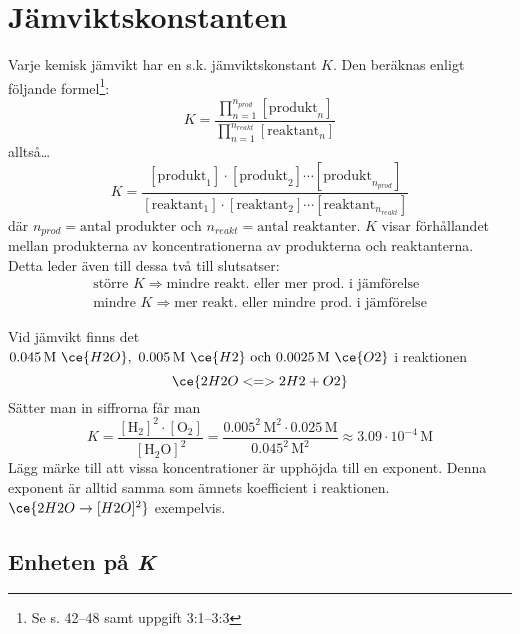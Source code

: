 \section{Jämviktskonstanten}

Varje kemisk jämvikt har en s.k. jämviktskonstant $K$. Den beräknas enligt följande formel\footnote{Se s. 42--48 samt uppgift 3:1--3:3}:
\begin{equation*}
    \label{eq:jmvkonstant}
    K = \frac{\prod_{n=1}^{n_{prod}}[\mathrm{produkt}_n]}{\prod_{n=1}^{n_{reakt}}[\mathrm{reaktant}_n]}
\end{equation*}
alltså\ldots
\begin{equation*}
    K = \frac{[\mathrm{produkt}_1] \cdot [\mathrm{produkt}_2] \dotsm [\mathrm{produkt}_{n_{prod}}]}{[\mathrm{reaktant}_1] \cdot [\mathrm{reaktant}_2] \dotsm [\mathrm{reaktant}_{n_{reakt}}]}
\end{equation*}
där $n_{prod} = \text{antal produkter och } n_{reakt} = \text{antal reaktanter}$. $K$ visar förhållandet mellan produkterna av koncentrationerna av produkterna och reaktanterna. Detta leder även till dessa två till slutsatser:
\begin{align*}
    \text{större } K \Rightarrow \text{mindre reakt. eller mer prod. i jämförelse} \\
    \text{mindre } K \Rightarrow \text{mer reakt. eller mindre prod. i jämförelse} 
\end{align*}
\begin{exm}
    Vid jämvikt finns det $ \mathrm{0.045\,M} \ \ce{H2O},\ \mathrm{0.005\,M} \ \ce{H2} \text{ och } \mathrm{0.0025\,M} \ \ce{O2}$ i reaktionen
    \begin{equation*}
        \ce{2H2O <=> 2H2 + O2}
    \end{equation*}
    Sätter man in siffrorna får man
    \begin{equation*}
        K = \frac{\mathrm{[H_2]^2 \cdot [O_2]}}{\mathrm{[H_2O]^2}} = \frac{0.005^2\,\mathrm{M^2} \cdot 0.025\,\mathrm{M}}{0.045^2\,\mathrm{M^2}} \approx 3.09 \cdot 10^{-4} \, \mathrm{M}
    \end{equation*}
    Lägg märke till att vissa koncentrationer är upphöjda till en exponent. Denna exponent är alltid samma som ämnets koefficient i reaktionen. \\ $\ce{2H2O \rightarrow [H2O]^2}$ exempelvis.
\end{exm}

\subsection{Enheten på \textit{K}}


